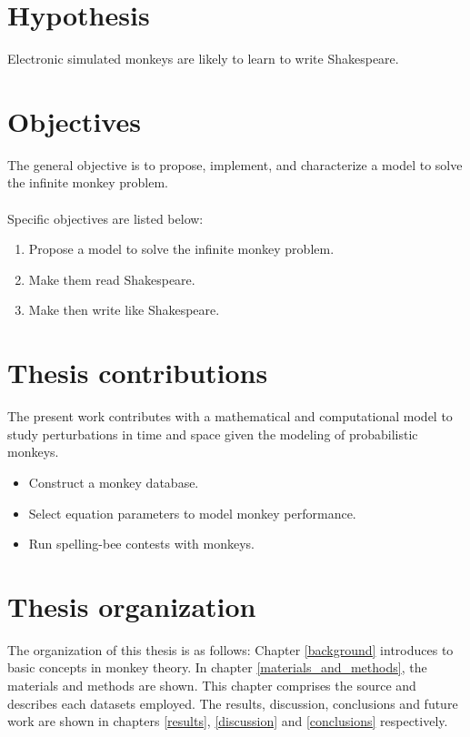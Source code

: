\section{Hypothesis} \label{hypothesis}

Electronic simulated monkeys are likely to learn to write Shakespeare.

\section{Objectives} \label{objectives}

The general objective is to propose, implement, and characterize a model to solve the infinite monkey problem.
\\
\\
Specific objectives are listed below:

\begin{enumerate}
    \item Propose a model to solve the infinite monkey problem.
    \item Make them read Shakespeare.
    \item Make then write like Shakespeare.
\end{enumerate}


\section{Thesis contributions} \label{thesis_contributions}

The present work contributes with a mathematical and computational model to study 
perturbations in time and space given the modeling of probabilistic monkeys.

\begin{itemize}
	\item Construct a monkey database.
	\item Select equation parameters to model monkey performance.
	\item Run spelling-bee contests with monkeys.
\end{itemize}


\section{Thesis organization}

The organization of this thesis is as follows: Chapter \ref{background} introduces to basic concepts in monkey theory. In chapter \ref{materials_and_methods}, the materials and methods are shown. This chapter comprises the source and describes each datasets employed. The results, discussion,  conclusions and future work are shown in chapters \ref{results}, \ref{discussion} and \ref{conclusions} respectively.
